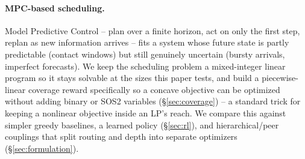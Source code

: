 \paragraph{MPC-based scheduling.} Model Predictive Control -- plan over a finite horizon, act on only the first step, replan as new information arrives -- fits a system whose future state is partly predictable (contact windows) but still genuinely uncertain (bursty arrivals, imperfect forecasts). We keep the scheduling problem a mixed-integer linear program so it stays solvable at the sizes this paper tests, and build a piecewise-linear coverage reward specifically so a concave objective can be optimized without adding binary or SOS2 variables (\S\ref{sec:coverage}) -- a standard trick for keeping a nonlinear objective inside an LP's reach. We compare this against simpler greedy baselines, a learned policy (\S\ref{sec:rl}), and hierarchical/peer couplings that split routing and depth into separate optimizers (\S\ref{sec:formulation}).
